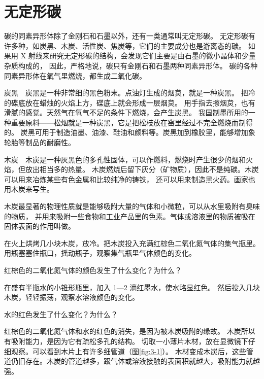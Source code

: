 \section{无定形碳}\label{sec:3-2}

碳的同素异形体除了金刚石和石墨以外，还有一类通常叫无定形碳。
无定形碳有许多种，如炭黑、木炭、活性炭、焦炭等，它们的主要成分也是游离态的碳。
如果用 X 射线来研究无定形碳的结构，会发现它们主要是由石墨的微小晶体和少量杂质构成的，
因此，严格地说，碳只有金刚石和石墨两种同素异形体。
碳的各种同素异形体在氧气里燃烧，都生成二氧化碳。

炭黑　炭黑是一种非常细的黑色粉末。点油灯生成的烟炱，就是一种炭黑。
把冷的碟底放在蜡烛的火焰上方，碟底上就会形成一层烟炱。
用手指去擦烟炱，也有滑膩的感觉。天然气在氧气不足的条件下燃烧，会产生炭黑。
我国制墨所用的一种重要原料——松烟就是一种炭黑，它是把松枝放在窑里经过不完全燃烧而制得的。
炭黑可用于制造油墨、油漆、鞋油和颜料等。炭黑加到橡胶里，能够增加象轮胎等制品的耐磨性。

木炭　木炭是一种灰黑色的多孔性固体，可以作燃料，燃烧时产生很少的烟和火焰，但放出相当多的热量。
木炭燃烧后留下灰分（矿物质），因此不是纯碳。木炭可以用来冶炼某些有色金属和比较纯净的铸铁，
还可以用来制造黑火药。画家也用木炭来写生。

木炭最显著的物理性质就是能够吸附大量的气体和小微粒，可以从水里吸附有臭味的物质，
并用来吸附一些食物和工业产品里的色素。气体或溶液里的物质被吸在固体表面的作用叫做。

\begin{shiyan}
    在火上烘烤几小块木炭，放冷。把木炭投入充满红棕色二氧化氮气体的集气瓶里。
    用瓶塞塞住瓶口，摇动瓶子，观察集气瓶里气体颜色的变化。
\end{shiyan}

红棕色的二氧化氮气体的颜色发生了什么变化？为什么？

\begin{shiyan}
    在盛有半瓶水的小锥形瓶里，加入 1—2 滴红墨水，使水略显红色。
    然后投入几块木炭，轻轻振荡，观察水溶液颜色的变化。
\end{shiyan}

水的红色发生了什么变化？为什么？

红棕色的二氧化氮气体和水的红色的消失，是因为被木炭吸附的缘故。
木炭所以有吸附能力，是因为它有疏松多孔的结构。
切取一小薄片木材，放在显微镜下仔细观察。可以看到木片上有许多细管道（图\ref{fig:3-1}）。
木材变成木炭后，这些管道仍旧存在。木炭的管道越多，跟气体或溶液接触的表面积就越大，吸附能力就越强。

